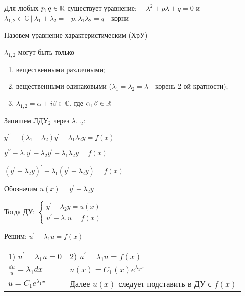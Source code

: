 \documentclass[12pt]{article}
\begin{document}
    Для любых $p, q \in \mathbb{R}$ существует уравнение: $\quad \lambda^2 + p\lambda + q = 0$ и $\lambda_{1,2} \in \mathbb{C} \ | \ \lambda_1 + \lambda_2 = -p, \lambda_1 \lambda_2 = q$ - корни

    Назовем уравнение характеристическим (ХрУ) \Cat

    \Nota $\lambda_{1, 2}$ могут быть только

    \begin{enumerate}
        \item вещественными различными;

        \item вещественными одинаковыми ($\lambda_1 = \lambda_2 = \lambda$ - корень 2-ой кратности);

        \item $\lambda_{1,2} = \alpha \pm i \beta \in \mathbb{C}$, где $\alpha, \beta \in \mathbb{R}$
    \end{enumerate}

    Запишем ЛДУ$_2$ через $\lambda_{1, 2}$:

    $y^{\prime\prime} - (\lambda_1 + \lambda_2) y^\prime + \lambda_1 \lambda_2 y = f(x)$

    $y^{\prime\prime} - \lambda_1 y^\prime - \lambda_2 y^\prime + \lambda_1 \lambda_2 y = f(x)$

    $(y^\prime - \lambda_2 y)^\prime - \lambda_1 (y^\prime - \lambda_2 y) = f(x)$

    Обозначим $u(x) = y^\prime - \lambda_2 y$

    Тогда ДУ: $\begin{cases}
                   y^\prime - \lambda_2 y = u(x) \\ u^\prime - \lambda_1 u = f(x)
    \end{cases}$

    Решим: $u^\prime - \lambda_1 u = f(x)$

    \begin{tabular}{p{5cm}p{10cm}}
        1) $u^\prime - \lambda_1 u = 0$      & 2) $u^\prime - \lambda_1 u = f(x)$            \\

        $\frac{du}{u} = \lambda_1 dx$        & $u(x) = C_1(x)e^{\lambda_1 x}$                \\

        $\overline{u} = C_1 e^{\lambda_1 x}$ & Далее $u(x)$ следует подставить в ДУ с $f(x)$ \\
    \end{tabular}
\end{document}
